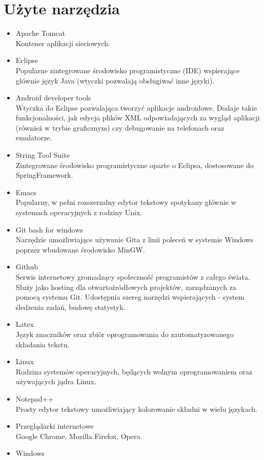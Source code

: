 \documentclass[11pt,a4paper,polish,thesis]{dcsbook}
\begin{document}
\section{Użyte narzędzia}
\begin{itemize}
\item{Apache Tomcat} \\
Kontener aplikacji sieciowych.
\item{Eclipse} \\
Popularne zintegrowane środowisko programistyczne (IDE) wspierające głównie język Java (wtyczki pozwalają obsługiwać inne języki). 
\item{Android developer tools} \\
Wtyczka do Eclipse pozwalająca tworzyć aplikacje androidowe. Dodaje takie funkcjonalności, jak edycja plików XML odpowiadających za wygląd aplikacji (również w trybie graficznym) czy debugowanie na telefonach oraz emulatorze.
\item{String Tool Suite} \\
Zintegrowane środowisko programistyczne oparte o Eclipsa, dostosowane do SpringFramework.
\item{Emacs} \\
Popularny, w pełni rozszerzalny edytor tekstowy spotykany głównie w systemach operacyjnych z rodziny Unix.
\item{Git bash for windows} \\
Narzędzie umożliwiające używanie Gita z linii poleceń w systemie Windows poprzez wbudowane środowisko MinGW.
\item{Github} \\
Serwis internetowy gromadzący społeczność programistów z całego świata. Służy jako hosting dla otwartoźródłowych projektów, zarządzanych za pomocą systemu Git.
Udostępnia szereg narzędzi wspierających - system śledzenia zadań, budowę statystyk.
\item{Latex} \\
Język znaczników oraz zbiór oprogramowania do zautomatyzowanego składania tekstu.
\item{Linux} \\
Rodzina systemów operacyjnych, będących wolnym oprogramowaniem oraz używających jądra Linux.
\item{Notepad++} \\
Prosty edytor tekstowy umożliwiający kolorowanie składni w wielu językach.
\item{Przeglądarki internetowe} \\
Google Chrome, Mozilla Firefox, Opera
\item{Windows} \\
\end{itemize}
\end{document}
